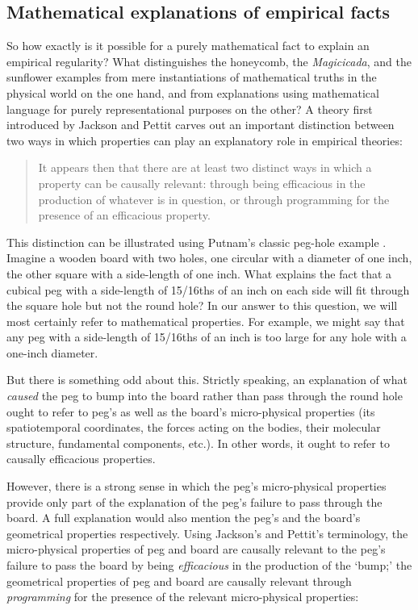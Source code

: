 \documentclass[a4paper,12pt]{article}
\begin{document}
\subsection{Mathematical explanations of empirical facts}

So how exactly is it possible for a purely mathematical fact to explain an empirical regularity? What distinguishes the honeycomb, the \textit{Magicicada}, and the sunflower examples from mere instantiations of mathematical truths in the physical world on the one hand, and from explanations using mathematical language for purely representational purposes on the other? A theory first introduced by Jackson and Pettit carves out an important distinction between two ways in which properties can play an explanatory role in empirical theories:

\blockquote{It appears then that there are at least two distinct ways in which a property can be causally relevant: through being efficacious in the production of whatever is in question, or through programming for the presence of an efficacious property. \cite[p.~115]{JacksonPettit1990}}

This distinction can be illustrated using Putnam's classic peg-hole example \cite[pp.~295ff]{Putnam1975}. Imagine a wooden board with two holes, one circular with a diameter of one inch, the other square with a side-length of one inch. What explains the fact that a cubical peg with a side-length of 15/16ths of an inch on each side will fit through the square hole but not the round hole? In our answer to this question, we will most certainly refer to mathematical properties. For example, we might say that any peg with a side-length of 15/16ths of an inch is too large for any hole with a one-inch diameter. 

But there is something odd about this. Strictly speaking, an explanation of what \textit{caused} the peg to bump into the board rather than pass through the round hole ought to refer to peg's as well as the board's micro-physical properties (its spatiotemporal coordinates, the forces acting on the bodies, their molecular structure, fundamental components, etc.). In other words, it ought to refer to causally efficacious properties.

However, there is a strong sense in which the peg's micro-physical properties provide only part of the explanation of the peg's failure to pass through the board. A full explanation would also mention the peg's and the board's geometrical properties respectively. Using Jackson's and Pettit's terminology, the micro-physical properties of peg and board are causally relevant to the peg's failure to pass the board by being \textit{efficacious} in the production of the `bump;' the geometrical properties of peg and board are causally relevant through \textit{programming} for the presence of the relevant micro-physical properties:
\end{document}
